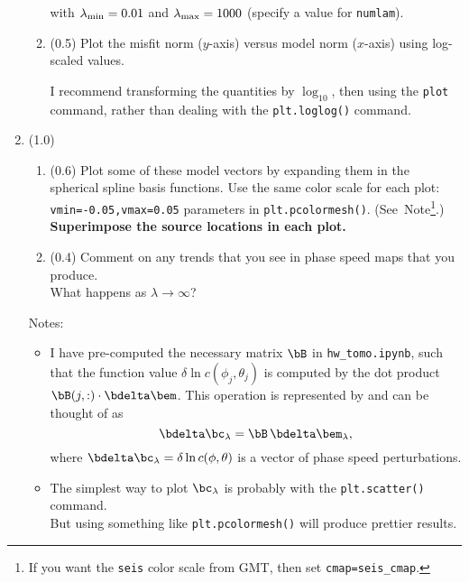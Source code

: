 \documentclass[11pt,titlepage,fleqn]{article}
\newcommand{\tfiletomo}{{\tt hw\_tomo.ipynb}}
\begin{document}
\begin{enumerate}
\begin{enumerate}
with $\lambda_{\rm min} = 0.01$ and $\lambda_{\rm max} = 1000$ (specify a value for \verb+numlam+).


\item (0.5) Plot the misfit norm ($y$-axis) versus model norm ($x$-axis) using log-scaled values.


I recommend transforming the quantities by $\log_{10}$, then using the \verb+plot+ command, rather than dealing with the \verb+plt.loglog()+ command.

\end{enumerate}


\pagebreak
\item (1.0) 

\begin{enumerate}
\item (0.6) Plot some of these model vectors by expanding them in the spherical spline basis functions. Use the same color scale for each plot: \verb+vmin=-0.05,vmax=0.05+ parameters in \verb+plt.pcolormesh()+. (See~Note\footnote{If you want the {\tt seis} color scale from GMT, then set {\tt cmap=seis\_cmap}.}.) {\bf Superimpose the source locations in each plot.}

\item (0.4) Comment on any trends that you see in phase speed maps that you produce. \\
What happens as $\lambda \rightarrow \infty$?
\end{enumerate}

Notes:
%
\begin{itemize}
\item I have pre-computed the necessary matrix $\bB$ in \tfiletomo, such that the function value $\delta\ln c(\phi_j, \theta_j)$ is computed by the dot product $\bB(j,:) \cdot \bdelta\bem$. This operation is represented by  and can be thought of as
%
\begin{equation}
\bdelta\bc_{\lambda} = \bB\,\bdelta\bem_{\lambda},
\label{Bexpand}
\end{equation}
%
where $\bdelta\bc_{\lambda} = \delta\ln c(\phi, \theta)$ is a vector of phase speed perturbations.

\item The simplest way to plot $\bc_{\lambda}$ is probably with the \verb+plt.scatter()+ command. \\ But using something like \verb+plt.pcolormesh()+ will produce prettier results.


\end{itemize}
\end{enumerate}
\end{document}
